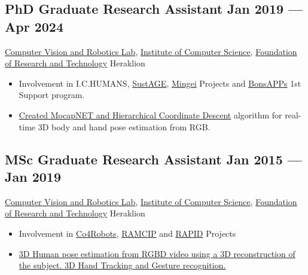 \documentclass[a4,8pt]{article}
\newcommand{\subtext}[1]{
#1\par\vspace{-0.2cm}}
\newenvironment{zitemize}{
\begin{itemize}\itemsep0pt \parskip0pt \parsep1pt}
{\end{itemize}\vspace{-0.5cm}}
\begin{document}
\subsection*{PhD Graduate Research Assistant \hfill Jan 2019 --- Apr 2024} 
\subtext{\href{https://www.ics.forth.gr/cvrl/}{Computer Vision and Robotics Lab}, \href{https://www.ics.forth.gr/}{Institute of Computer Science}, \href{https://www.forth.gr/}{Foundation of Research and Technology}  \hfill Heraklion} 
    \begin{zitemize}
        \item Involvement in I.C.HUMANS, \href{https://www.sustage.eu/}{SustAGE}, \href{https://www.mingei-project.eu/}{Mingei} Projects and \href{https://bonsapps.eu/}{BonsAPPs} 1st Support program. 
        \item \href{https://github.com/FORTH-ModelBasedTracker/MocapNET}{Created MocapNET and Hierarchical Coordinate Descent} algorithm for real-time 3D body and hand pose estimation from RGB.
    \end{zitemize}

\subsection*{MSc Graduate Research Assistant \hfill Jan 2015 --- Jan 2019} 
\subtext{\href{https://www.ics.forth.gr/cvrl/}{Computer Vision and Robotics Lab}, \href{https://www.ics.forth.gr/}{Institute of Computer Science}, \href{https://www.forth.gr/}{Foundation of Research and Technology}  \hfill Heraklion} 
    \begin{zitemize}
        \item Involvement in \href{http://www.co4robots.eu/}{Co4Robots}, \href{https://ramcip-project.eu/content/what-ramcip}{RAMCIP} and \href{http://www.rapid-project.eu/}{RAPID} Projects  
        \item \href{http://users.ics.forth.gr/~argyros/mypapers/2018_03_WACV_personalizedHumanPose.pdf}{3D Human pose estimation from RGBD video using a 3D reconstruction of the subject. 3D Hand Tracking and Gesture recognition.}
    \end{zitemize}

\end{document}
